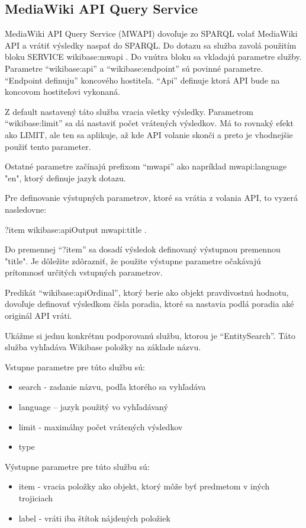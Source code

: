 \subsection{MediaWiki API Query Service}
MediaWiki API Query Service (MWAPI) dovoľuje zo SPARQL volať MediaWiki API a vrátiť výsledky naspať 
do SPARQL. 
Do dotazu sa služba zavolá použitím bloku SERVICE wikibase:mwapi {}. 
Do vnútra bloku sa vkladajú parametre služby. 
Parametre “wikibase:api” a “wikibase:endpoint” sú povinné parametre. “Endpoint definuju” koncového hostiteľa. 
“Api” definuje ktorá API bude na koncovom hostiteľovi vykonaná. 

Z default nastavený táto služba vracia všetky výsledky. Parametrom “wikibase:limit” sa dá nastaviť 
počet vrátených výsledkov. Má to rovnaký efekt ako LIMIT, ale ten sa aplikuje, až kde API volanie skonči a preto je vhodnejšie použiť tento parameter. 

Ostatné parametre začínajú prefixom 
“mwapi” ako napríklad mwapi:language "en", ktorý definuje jazyk dotazu. 

Pre definovanie výstupných parametrov, ktoré sa vrátia z volania API, to  
vyzerá nasledovne: 
\begin{code}
    ?item wikibase:apiOutput mwapi:title .
\end{code}

Do premennej “?item” sa dosadí výsledok definovaný výstupnou premennou "title". Je dôležite 
zdôrazniť, že použite výstupne parametre očakávajú prítomnosť určitých vstupných parametrov. 

Predikát “wikibase:apiOrdinal”, ktorý berie ako objekt pravdivostnú hodnotu, dovoľuje definovať 
výsledkom čísla poradia, ktoré sa nastavia podlá poradia aké originál API vráti. 

Ukážme si jednu konkrétnu podporovanú službu, ktorou je “EntitySearch”. 
Táto služba vyhľadáva Wikibase položky na základe názvu. 

Vstupne parametre pre túto službu sú: 
\begin{itemize}
    \item search - zadanie názvu, podľa ktorého sa vyhľadáva 
    \item language – jazyk použitý vo vyhľadávaný 
    \item limit - maximálny počet vrátených výsledkov 
    \item type 
\end{itemize}

Výstupne parametre pre túto službu sú: 
\begin{itemize}
    \item item - vracia položky ako objekt, ktorý môže byť predmetom v iných trojiciach 
    \item label - vráti iba štítok nájdených položiek 
\end{itemize}

